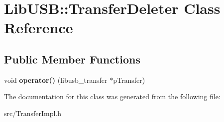 \hypertarget{class_lib_u_s_b_1_1_transfer_deleter}{\section{Lib\-U\-S\-B\-:\-:Transfer\-Deleter Class Reference}
\label{class_lib_u_s_b_1_1_transfer_deleter}
}
\subsection*{Public Member Functions}
\begin{DoxyCompactItemize}
\item 
\hypertarget{class_lib_u_s_b_1_1_transfer_deleter_a62b18938a935fb6a7439269d3129f9ea}{void {\bfseries operator()} (libusb\-\_\-transfer $\ast$p\-Transfer)}\label{class_lib_u_s_b_1_1_transfer_deleter_a62b18938a935fb6a7439269d3129f9ea}

\end{DoxyCompactItemize}


The documentation for this class was generated from the following file\-:\begin{DoxyCompactItemize}
\item 
src/Transfer\-Impl.\-h\end{DoxyCompactItemize}
